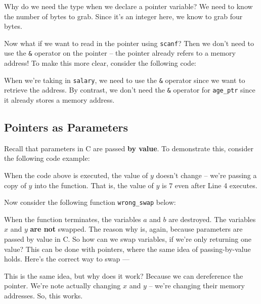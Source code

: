 Why do we need the type when we declare a pointer variable? We need to know the number of bytes to grab. Since it's an integer here, we know to grab four bytes. 


Now what if we want to read in the pointer using \verb!scanf!? Then we don't need to use the \verb!&! operator on the pointer -- the pointer already refers to a memory address! To make this more clear, consider the following code:


\lstset{
caption=Pointers Example
}
\begin{center}

\end{center}

When we're taking in \verb!salary!, we need to use the \verb!&! operator since we want to retrieve the address. By contrast, we don't need the \verb!&! operator for \verb!age_ptr! since it already stores a memory address.


\subsection{Pointers as Parameters}

Recall that parameters in C are passed \textbf{by value}. To demonstrate this, consider the following code example:

\lstset{
caption=Variables Passed by Value
}
\begin{center}

\end{center}

When the code above is executed, the value of $y$ doesn't change -- we're passing a copy of $y$ into the function. That is, the value of $y$ is $7$ even after Line 4 executes. 


Now consider the following function \verb!wrong_swap! below:

\lstset{
caption=Variables Passed by Value
}
\begin{center}

\end{center}

When the function terminates, the variables $a$ and $b$ are destroyed. The variables $x$ and $y$ \textbf{are not} swapped. The reason why is, again, because parameters are passed by value in C. So how can we swap variables, if we're only returning one value? This can be done with pointers, where the same idea of passing-by-value holds. Here's the correct way to swap --- \newpage

\lstset{
caption=Variables Passed by Value
}
\begin{center}

\end{center}


This is the same idea, but why does it work? Because we can dereference the pointer. We're note actually changing $x$ and $y$ -- we're changing their memory addresses. So, this works.



 




